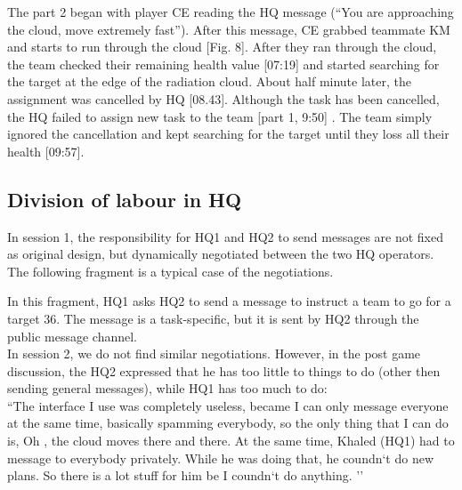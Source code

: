 The part 2 began with player CE reading the HQ message (``You are approaching the cloud, move extremely fast''). After this message, CE grabbed teammate KM and starts to run through the cloud [Fig. 8].  After they ran through the cloud, the team checked their remaining health value [07:19] and started searching for the target at the edge of the radiation cloud. About half minute later, the assignment was cancelled by HQ [08.43]. Although the task has been cancelled, the HQ failed to assign new task to the team [part 1, 9:50] . The team simply ignored the cancellation and kept searching for the target until they loss all their health [09:57]. \\

\subsection{Division of labour in HQ}

In session 1, the responsibility for HQ1 and HQ2 to send messages are not fixed as original design, but dynamically negotiated between the two HQ operators. The following fragment is a typical case of the negotiations.\\

\noindent{}

In this fragment, HQ1 asks HQ2 to send a message to instruct a team to go for a target 36. The message is a task-specific, but it is sent by HQ2 through the public message channel. \\

In session 2, we do not find similar negotiations. However, in the post game discussion, the HQ2 expressed that he has too little to things to do (other then sending general messages), while HQ1 has too much to do:   \\

``The interface I use was completely useless, became I can only message everyone at the same time, basically spamming everybody, so the only thing that I can do is, Oh , the cloud moves there and there. At the same time, Khaled (HQ1) had to message to everybody privately. While he was doing that, he coundn`t do new plans. So there is a lot stuff for him be I coundn`t do anything. ''

